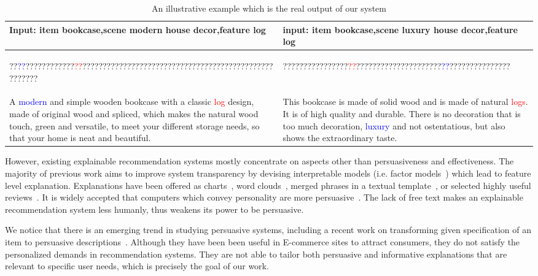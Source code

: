 \documentclass[sigconf]{acmart}
\begin{document}
\begin{table}
  \caption{An illustrative example which is the real output of our system}
  \label{table:example}
  \begin{tabular}{p{8cm} p{8cm}}
    \toprule
    Input: item bookcase,scene modern house decor,feature log & input: item bookcase,scene luxury house decor,feature log \\
    \midrule
    \begin{CJK*}{UTF8}{gbsn}
        ??\textcolor{blue}{??}????????????\textcolor{red}{??}??????????????????????????????????????????????????????
    \end{CJK*} & 
    \begin{CJK*}{UTF8}{gbsn}
        ????????????????\textcolor{red}{??}?????????????????????\textcolor{blue}{??}??????????????? 
    \end{CJK*}\\
    A \textcolor{blue}{modern} and simple wooden bookcase with a classic \textcolor{red}{log} design, made of original wood and spliced, which makes the natural wood touch, green and versatile, to meet your different storage needs, so that your home is neat and beautiful.  &
    This bookcase is made of solid wood and is made of natural \textcolor{red}{logs}. It is of high quality and durable. There is no decoration that is too much decoration, \textcolor{blue}{luxury} and not ostentatious, but also shows the extraordinary taste.\\
    \bottomrule
\end{tabular}
\end{table}

However, existing explainable recommendation systems mostly concentrate on aspects other than persuasiveness and effectiveness.  The majority of previous work aims to improve system transparency by devising interpretable models (i.e. factor models~\cite{Zhang2014Explicit,Zhang2015Daily,Wu2015FLAME}) which lead to feature level explanation. Explanations have been offered as charts~\cite{Zhao2016Exploring}, word clouds~\cite{Wu2015FLAME}, merged phrases in a textual template~\cite{Zhang2014Explicit,Zhang2015Daily}, or selected highly useful reviews~\cite{Chen2018Neural}. 
It is widely accepted that computers which convey personality are more persuasive~\cite{Yoo2011Creating}. The lack of free text makes an explainable recommendation system less humanly, thus weakens its power to be persuasive. 

We notice that there is an emerging trend in studying persuasive systems, including a recent work on transforming given specification of an item to persuasive descriptions~\cite{munigala2018persuaide}. Although they have been been useful in E-commerce sites to attract consumers, they do not satisfy the personalized demands in recommendation systems. They are not able to tailor both persuasive and informative explanations that are relevant to specific user needs, which is precisely the goal of our work.
\end{document}

